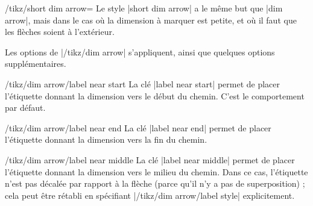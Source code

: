\documentclass[a4paper]{ltxdoc}
\begin{document}
\begin{stylekey}{/tikz/short dim arrow=}
  Le style |short dim arrow| a le même but que |dim arrow|, mais dans le cas où la dimension à marquer est petite, et où il faut que les flèches soient à l'extérieur.

  \begin{codeexample}[width=4cm]
  \end{codeexample}

  Les options de |/tikz/dim arrow| s'appliquent, ainsi que quelques options supplémentaires.

  \begin{key}{/tikz/dim arrow/label near start}
  La clé |label near start| permet de placer l'étiquette donnant la dimension vers le début du chemin.
  C'est le comportement par défaut.

\begin{codeexample}[]
\end{codeexample}
  \end{key}

  \begin{key}{/tikz/dim arrow/label near end}
  La clé |label near end| permet de placer l'étiquette donnant la dimension vers la fin du chemin.

\begin{codeexample}[]
\end{codeexample}
  \end{key}

  \begin{key}{/tikz/dim arrow/label near middle}
  La clé |label near middle| permet de placer l'étiquette donnant la dimension vers le milieu du chemin.
  Dans ce cas, l'étiquette n'est pas décalée par rapport à la flèche (parce qu'il n'y a pas de superposition) ; cela peut être rétabli en spécifiant |/tikz/dim arrow/label style| explicitement.


\end{key}
\end{stylekey}
\end{document}
